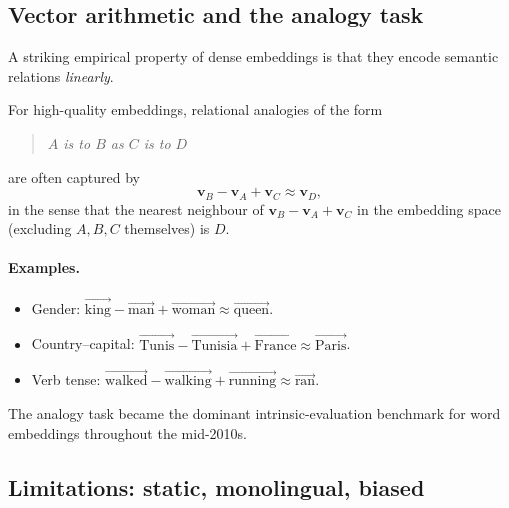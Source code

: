 \subsection{Vector arithmetic and the analogy task}

A striking empirical property of dense embeddings is that they encode semantic relations \emph{linearly}.

\begin{property}
For high-quality embeddings, relational analogies of the form
\begin{quote}
\emph{$A$ is to $B$ as $C$ is to $D$}
\end{quote}
are often captured by
\[ \mathbf{v}_B - \mathbf{v}_A + \mathbf{v}_C \approx \mathbf{v}_D, \]
in the sense that the nearest neighbour of $\mathbf{v}_B - \mathbf{v}_A + \mathbf{v}_C$ in the embedding space (excluding $A, B, C$ themselves) is $D$.
\end{property}

\paragraph{Examples.}
\begin{itemize}
    \item Gender: $\overrightarrow{\text{king}} - \overrightarrow{\text{man}} + \overrightarrow{\text{woman}} \approx \overrightarrow{\text{queen}}$.
    \item Country--capital: $\overrightarrow{\text{Tunis}} - \overrightarrow{\text{Tunisia}} + \overrightarrow{\text{France}} \approx \overrightarrow{\text{Paris}}$.
    \item Verb tense: $\overrightarrow{\text{walked}} - \overrightarrow{\text{walking}} + \overrightarrow{\text{running}} \approx \overrightarrow{\text{ran}}$.
\end{itemize}

The analogy task became the dominant intrinsic-evaluation benchmark for word embeddings throughout the mid-2010s.

\subsection{Limitations: static, monolingual, biased}

